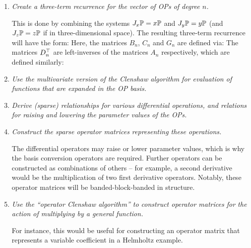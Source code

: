\begin{enumerate}
	\item \textit{Create a three-term recurrence for the vector of OPs of degree $n$.}
	
		This is done by combining the systems $J_x \mathbb{P} = x \mathbb{P}$ and $J_y \mathbb{P} = y \mathbb{P}$ (and $J_z \mathbb{P} = z \mathbb{P}$ if in three-dimensional space). The resulting three-term recurrence will have the form:
		Here, the matrices $B_n$, $C_n$ and $G_n$ are defined via:
		The matrices $D^\top_n$ are left-inverses of the matrices $A_n$ respectively, which are defined similarly:
		
	\item \textit{Use the multivariate version of the Clenshaw algorithm for evaluation of functions that are expanded in the OP basis.}
	
	\item \textit{Derive (sparse) relationships for various differential operations, and relations for raising and lowering the parameter values of the OPs.}
	
	\item \textit{Construct the sparse operator matrices representing these operations.}
		
		The differential operators may raise or lower parameter values, which is why the basis conversion operators are required. Further operators can be constructed as combinations of others -- for example, a second derivative would be the multiplication of two first derivative operators. Notably, these operator matrices will be banded-block-banded in structure.
		
	\item \textit{Use the \enquote{operator Clenshaw algorithm} to construct operator matrices for the action of multiplying by a general function.}
	
		For instance, this would be useful for constructing an operator matrix that represents a variable coefficient in a Helmholtz example.
\end{enumerate}

